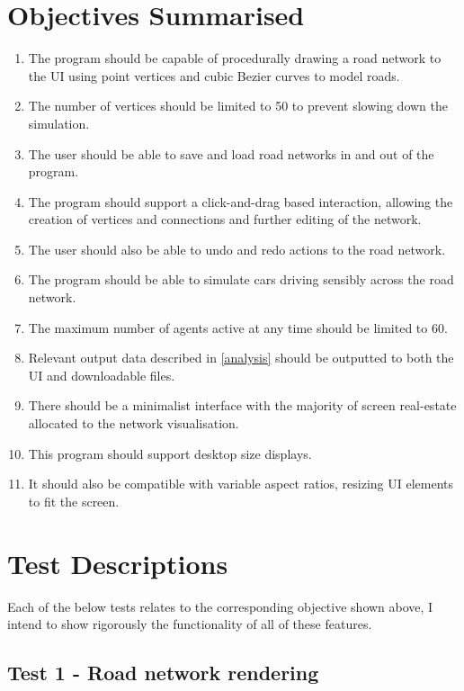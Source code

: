 \section{Objectives Summarised}

    \begin{enumerate}
        \item The program should be capable of procedurally drawing a road network to the UI using point vertices and cubic Bezier curves to model roads.
        \item The number of vertices should be limited to 50 to prevent slowing down the simulation.
        \item The user should be able to save and load road networks in and out of the program.
        \item The program should support a click-and-drag based interaction, allowing the creation of vertices and connections and further editing of the network.
        \item The user should also be able to undo and redo actions to the road network.
        \item The program should be able to simulate cars driving sensibly across the road network.
        \item The maximum number of agents active at any time should be limited to 60.
        \item Relevant output data described in \autoref{analysis} should be outputted to both the UI and downloadable files.
        \item There should be a minimalist interface with the majority of screen real-estate allocated to the network visualisation.
        \item This program should support desktop size displays.
        \item It should also be compatible with variable aspect ratios, resizing UI elements to fit the screen.
    \end{enumerate}

\section{Test Descriptions}

    Each of the below tests relates to the corresponding objective shown above, I intend to show rigorously the functionality of all of these features.

    \subsection{Test 1 - Road network rendering}
    \label{testing:t1}


